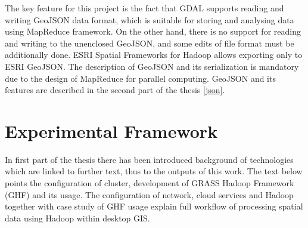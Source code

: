 \documentclass[a4paper,12pt,oneside]{report}
\begin{document}
	The key feature for this project is the fact that GDAL supports reading and writing GeoJSON data
	format, which is suitable for storing and analysing data using MapReduce framework. On the other hand, there is no support for reading and writing to the unenclosed GeoJSON, and some edits of file format must be additionally done. 
	ESRI Spatial Frameworks for Hadoop allows exporting only to ESRI GeoJSON. The description of
	GeoJSON and its serialization is mandatory due to the design of MapReduce 
	for parallel computing. GeoJSON and its features are described in the second
	part of the thesis \ref{json}.
	
	
	
	
	
	\newpage
	\chapter*{Experimental Framework}
	In first part of the thesis there has been introduced background of technologies which are 
	linked to further text, thus to the outputs  of this work. The text below points the 
	configuration of cluster, development of GRASS Hadoop Framework (GHF) and its usage.
	The configuration of network, cloud services and Hadoop together with case study of 
	GHF usage explain full workflow of processing spatial data using Hadoop within desktop GIS.
	
\end{document}
